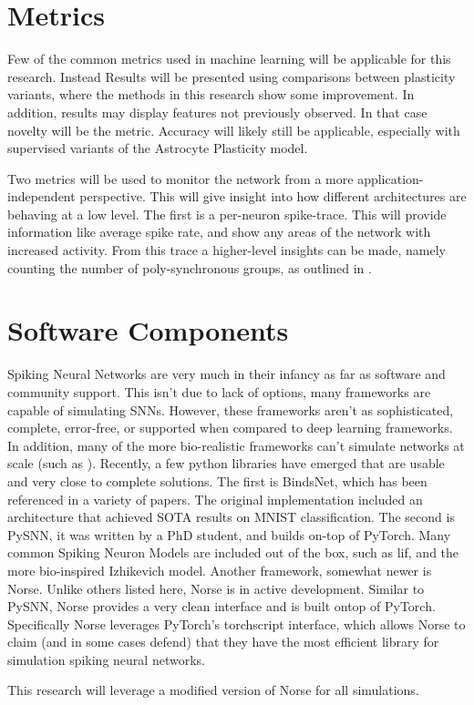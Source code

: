     \section{Metrics} \label{section:metrics}
    Few of the common metrics used in machine learning will be applicable for
    this research. Instead Results will be presented using comparisons between
    plasticity variants, where the methods in this research show some
    improvement. In addition, results may display features not previously
    observed. In that case novelty will be the metric. Accuracy will likely
    still be applicable, especially with supervised variants of the Astrocyte
    Plasticity model.
    
    Two metrics will be used to monitor the network from a more
    application-independent perspective. This will give insight into how
    different architectures are behaving at a low level. The first is a
    per-neuron spike-trace. This will provide information like average spike
    rate, and show any areas of the network with increased activity. From this
    trace a higher-level insights can be made, namely counting the number of
    poly-synchronous groups, as outlined in \cite{sgnn_transistor}.
    
    \section{Software Components}
    Spiking Neural Networks are very much in their infancy as far as software
    and community support. This isn't due to lack of options, many frameworks
    are capable of simulating SNNs. However, these frameworks aren't as
    sophisticated, complete, error-free, or supported when compared to deep
    learning frameworks. In addition, many of the more bio-realistic 
    frameworks can't simulate networks at scale (such as \cite{nest}). Recently, a few
    python libraries have emerged that are usable and very close to complete
    solutions. The first is BindsNet, which has been referenced in a variety of
    papers. The original implementation included an architecture that achieved
    SOTA results on MNIST classification. The second is PySNN, it was written by
    a PhD student, and builds on-top of PyTorch. Many common Spiking Neuron
    Models are included out of the box, such as \Gls{lif}, and the more bio-inspired
    Izhikevich model. Another framework, somewhat newer is Norse. Unlike others
    listed here, Norse is in active development. Similar to PySNN, Norse
    provides a very clean interface and is built ontop of PyTorch. Specifically
    Norse leverages PyTorch's torchscript interface, which allows Norse to claim
    (and in some cases defend) that they have the most efficient library for
    simulation spiking neural networks.

    This research will leverage a modified version of Norse for all simulations.
    
